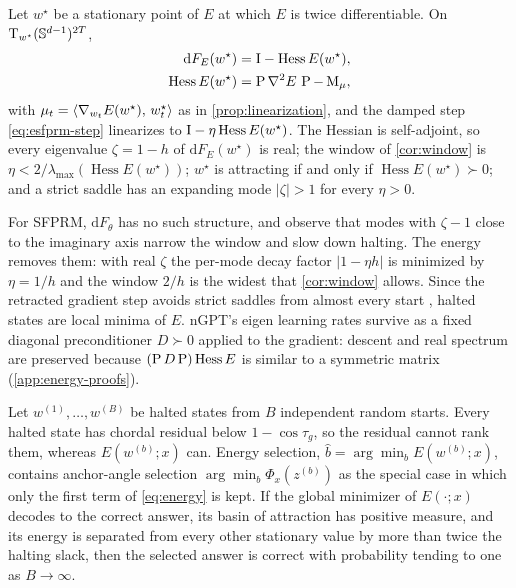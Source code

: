 \begin{proposition}
\label{prop:real-spectrum}
Let $w^\star$ be a stationary point of $E$ at which $E$ is twice differentiable. On
$\mathrm{T}_{w^\star}(\mathbb{S}^{d-1})^{2T}$,
\begin{equation}
\begin{aligned}
  \mathrm dF_E(w^\star)&=\mathrm{I}-\operatorname{Hess}E(w^\star),\\
  \operatorname{Hess}E(w^\star)&=\operatorname{P}\nabla^2E\,\operatorname{P}-\operatorname{M}_\mu,
\end{aligned}
\end{equation}
with $\mu_t=\langle \nabla_{w_t}E(w^\star),\, w^\star_t\rangle$ as in \cref{prop:linearization}, and the damped
step \eqref{eq:esfprm-step} linearizes to $\mathrm{I}-\eta\operatorname{Hess}E(w^\star)$. The Hessian is
self-adjoint, so every eigenvalue $\zeta=1-h$ of $\mathrm dF_E(w^\star)$ is real; the window of
\cref{cor:window} is $\eta<2/\lambda_{\max}(\operatorname{Hess}E(w^\star))$; $w^\star$ is
attracting if and only if $\operatorname{Hess}E(w^\star)\succ0$; and a strict saddle has an
expanding mode $|\zeta|>1$ for every $\eta>0$.
\end{proposition}

For SFPRM, $\mathrm dF_\theta$ has no such structure, and \citet{sfprm} observe that modes with
$\zeta-1$ close to the imaginary axis narrow the window and slow down halting. The energy removes
them: with real $\zeta$ the per-mode decay factor $|1-\eta h|$ is minimized by $\eta=1/h$ and the
window $2/h$ is the widest that \cref{cor:window} allows. Since the retracted gradient step avoids
strict saddles from almost every start \citep{lee2019saddle}, halted states are local minima of $E$.
nGPT's eigen learning rates survive as a fixed diagonal preconditioner $D\succ0$ applied to the
gradient: descent and real spectrum are preserved because $(\operatorname{P} D\operatorname{P})\operatorname{Hess}E$ is
similar to a symmetric matrix (\cref{app:energy-proofs}).

\begin{proposition}
\label{prop:voting}
Let $w^{(1)},\dots,w^{(B)}$ be halted states from $B$ independent random starts. Every halted
state has chordal residual below $1-\cos\tau_g$, so the residual cannot rank them, whereas
$E(w^{(b)};x)$ can. Energy selection, $\hat b=\arg\min_bE(w^{(b)};x)$, contains anchor-angle
selection $\arg\min_b\Phi_x(z^{(b)})$ as the special case in which only the first term of
\eqref{eq:energy} is kept. If the global minimizer of $E(\cdot;x)$ decodes to the correct answer, its
basin of attraction has positive measure, and its energy is separated from every other stationary
value by more than twice the halting slack, then the selected answer is correct with probability
tending to one as $B\to\infty$.
\end{proposition}

